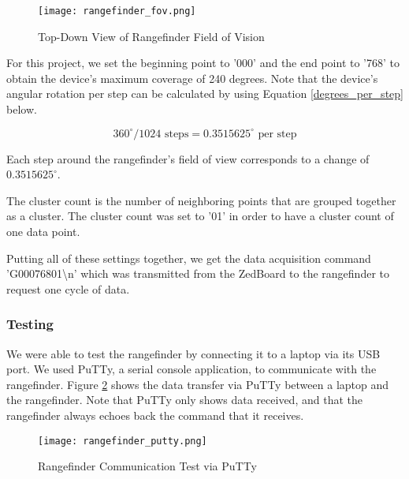 \begin{figure}[H]
	\centerline{\texttt{[image: rangefinder\_fov.png]}}
	\caption{Top-Down View of Rangefinder Field of Vision \cite{urg04lx_datasheet}}
	\label{rangefinder_fov}
\end{figure}

For this project, we set the beginning point to '000' and the end point to '768' to obtain the device's maximum coverage of 240 degrees. Note that the device's angular rotation per step can be calculated by using Equation \ref{degrees_per_step} below.

\begin{equation}
	360^\circ / 1024 \textrm{ steps}  = 0.3515625^\circ \textrm{ per step}
	\label{degrees_per_step}
\end{equation}

Each step around the rangefinder's field of view corresponds to a change of $0.3515625^\circ$.
\par
The cluster count is the number of neighboring points that are grouped together as a cluster. The cluster count was set to '01' in order to have a cluster count of one data point.
\par
Putting all of these settings together, we get the data acquisition command 'G00076801\textbackslash{}n' which was transmitted from the ZedBoard to the rangefinder to request one cycle of data.

\subsubsection{Testing}
We were able to test the rangefinder by connecting it to a laptop via its USB port. We used PuTTy, a serial console application, to communicate with the rangefinder. Figure \ref{rangefinder_putty} shows the data transfer via PuTTy between a laptop and the rangefinder. Note that PuTTy only shows data received, and that the rangefinder always echoes back the command that it receives.

\begin{figure}[H]
	\centerline{\texttt{[image: rangefinder\_putty.png]}}
	\caption{Rangefinder Communication Test via PuTTy}
	\label{rangefinder_putty}
\end{figure}

